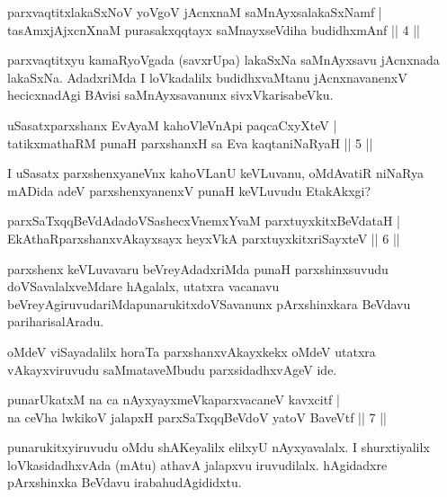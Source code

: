 
\begin{shl}
parxvaqtitxlakaSxNoV yoVgoV jAcnxnaM saMnAyxsalakaSxNamf |\\
tasAmxjAjxcnXnaM purasakxqqtayx saMnayxseVdiha budidhxmAnf \hfill || 4 ||
\end{shl}

\begin{artha}%
parxvaqtitxyu kamaRyoVgada (savxrUpa) lakaSxNa saMnAyxsavu jAcnxnada lakaSxNa. AdadxriMda I loVkadalilx budidhxvaMtanu jAcnxnavanenxV hecicxnadAgi BAvisi saMnAyxsavanunx sivxVkarisabeVku.
\end{artha}


\begin{shl}
uSasatxparxshanx EvAyaM kahoVleVnApi paqcaCxyXteV |\\
tatikxmathaRM punaH parxshanxH sa Eva kaqtaniNaRyaH \hfill || 5 ||
\end{shl}

\begin{artha}
I uSasatx parxshenxyaneVnx kahoVLanU keVLuvanu, oMdAvatiR niNaRya mADida adeV parxshenxyanenxV punaH keVLuvudu EtakAkxgi?
\end{artha}

\begin{shl}
parxSaTxqqBeVdAdadoVSashecxVnemxYvaM parxtuyxkitxBeVdataH |\\
EkAthaRparxshanxvAkayxsayx heyxVkA parxtuyxkitxriSayxteV \hfill || 6 ||
\end{shl}

\begin{artha}
parxshenx keVLuvavaru beVreyAdadxriMda punaH parxshinxsuvudu doVSa\-\break valalxveMdare hAgalalx, utatxra vacanavu beVreyAgiruvudariMda\break punarukitxdoVSavanunx pArxshinxkara BeVdavu pariharisalAradu.

oMdeV viSayadalilx horaTa parxshanxvAkayxkekx oMdeV utatxra vAkayxviruvudu saMmataveMbudu parxsidadhxvAgeV ide. 
\end{artha}

\begin{shl}
punarUkatxM na ca nAyxyayxmeVkaparxvacaneV kavxcitf |\\
na ceVha lwkikoV jalapxH parxSaTxqqBeVdoV yatoV BaveVtf \hfill || 7 ||
\end{shl}

\begin{artha}
punarukitxyiruvudu oMdu shAKeyalilx elilxyU nAyxyavalalx. I shurxtiyalilx loVkasidadhxvAda (mAtu) athavA jalapxvu iruvudilalx. hAgidadxre pArxshinxka BeVdavu irabahudAgididxtu.
\end{artha}

